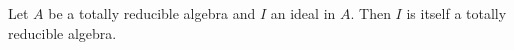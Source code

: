 Let $A$ be a totally reducible algebra and $I$ an ideal in $A$. Then $I$ is itself a totally reducible algebra.
